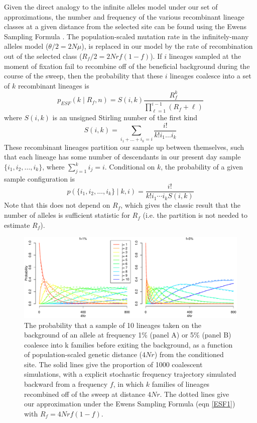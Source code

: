 \documentclass[a4paper,10pt]{article}
\begin{document}
Given the direct analogy to the infinite alleles model under our set of approximations, the number and frequency of the various recombinant lineage classes at a given distance from the selected site can be found using the Ewens Sampling Formula \citep{Ewens1972}. The population-scaled mutation rate in the infinitely-many alleles model ($\theta/2=2N\mu$), is replaced in our model by the rate of recombination out of the selected class ($R_{f}/2=2Nrf(1-f)$). If $i$ lineages sampled at the moment of fixation fail to recombine off of the beneficial background during the course of the sweep, then the probability that these $i$ lineages coalesce into a set of $k$ recombinant lineages is 
\begin{equation}
	p_{ESF}(k \mid R_f,n)  = S(i,k) \frac{R_f^k}{ \prod_{\ell=1}^{i-1} (R_f +\ell) }  \label{ESF1}
\end{equation}
where $S(i,k)$ is an unsigned Stirling number of the first kind
\begin{equation}
	S(i,k) = \sum_{i_1 + \dots + i_k = i} \frac{i!}{k!i_1\dots i_k}
\end{equation}
These recombinant lineages partition our sample up between themselves, such that each lineage has some number of descendants in our present day sample $\{i_1,i_2,\dots,i_k\}$, where $\sum_{j=1}^k i_j =i$. Conditional on $k$, the probability of a given sample configuration is
\begin{equation}
	p(\{i_1,i_2,\dots,i_k\} \mid k,i) = \frac{i!}{k! i_1\cdots i_k S(i,k)}  \label{ESF2}
\end{equation}
Note that this does not depend on $R_f$, which gives the classic result that the number of alleles is sufficient statistic for $R_f$ (i.e. the partition is not needed to estimate $R_f$).


\begin{figure}
	\includegraphics[width = \textwidth]{../Paper_Figures/Prob_hap_distribution.pdf}
\caption{The probability that a sample of 10 lineages taken on the background of an allele at frequency 1\% (panel A) or 5\% (panel B) coalesce into k families before exiting the background, as a function of population-scaled genetic distance ($4Nr$) from the conditioned site. The solid lines give the proportion of 1000 coalescent simulations, with a explicit stochastic frequency trajectory simulated backward from a frequency $f$, in which $k$ families of lineages recombined off of the sweep at distance $4Nr$.  The dotted lines give our approximation under the Ewens Sampling Formula (eqn \eqref{ESF1}) with $R_f=4Nrf(1-f)$. } \label{Prob_hap_distribution}
\end{figure}
\end{document}
